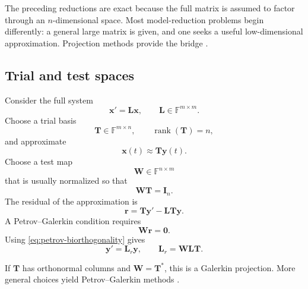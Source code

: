 \documentclass[11pt]{article}
\newcommand{\F}{\mathbb{F}}
\newcommand{\I}{\mathbf{I}}
\newcommand{\mat}[1]{\mathbf{#1}}
\newcommand{\vect}[1]{\mathbf{#1}}
\newcommand{\rank}{\operatorname{rank}}
\theoremstyle{definition}
\theoremstyle{remark}
\begin{document}
The preceding reductions are exact because the full matrix is assumed to factor through an \(n\)-dimensional space. Most model-reduction problems begin differently: a general large matrix is given, and one seeks a useful low-dimensional approximation. Projection methods provide the bridge \parencite{antoulas2005approximation,benner2015survey,quarteroni2016reduced}.

\subsection{Trial and test spaces}

Consider the full system
\begin{equation}
  \vect{x}'=\mat{L}\vect{x},
  \qquad
  \mat{L}\in\F^{m\times m}.
  \label{eq:general-full-ode}
\end{equation}
Choose a trial basis
\begin{equation}
  \mat{T}\in\F^{m\times n},
  \qquad
  \rank(\mat{T})=n,
  \label{eq:trial-basis}
\end{equation}
and approximate
\begin{equation}
  \vect{x}(t)\approx\mat{T}\vect{y}(t).
  \label{eq:trial-approximation}
\end{equation}
Choose a test map
\begin{equation}
  \mat{W}\in\F^{n\times m}
  \label{eq:test-map}
\end{equation}
that is usually normalized so that
\begin{equation}
  \mat{W}\mat{T}=\I_n.
  \label{eq:petrov-biorthogonality}
\end{equation}
The residual of the approximation is
\begin{equation}
  \vect{r}
  =\mat{T}\vect{y}'-\mat{L}\mat{T}\vect{y}.
  \label{eq:projection-residual}
\end{equation}
A Petrov--Galerkin condition requires
\begin{equation}
  \mat{W}\vect{r}=\vect{0}.
  \label{eq:petrov-condition}
\end{equation}
Using \cref{eq:petrov-biorthogonality} gives
\begin{equation}
  \vect{y}'=\mat{L}_r\vect{y},
  \qquad
  \mat{L}_r=\mat{W}\mat{L}\mat{T}.
  \label{eq:projected-operator}
\end{equation}

If \(\mat{T}\) has orthonormal columns and \(\mat{W}=\mat{T}^{*}\), this is a Galerkin projection. More general choices yield Petrov--Galerkin methods \parencite{quarteroni2016reduced,benner2015survey}.
\end{document}
